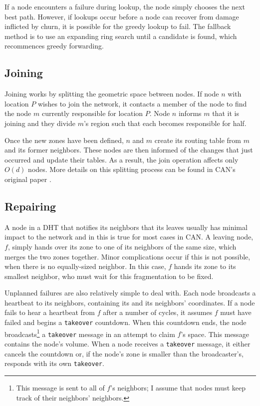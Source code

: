 \documentclass[10pt,letterpaper,twoside]{report}
\begin{document}
If a node encounters a failure during lookup, the node simply chooses the next best path.
However, if lookups occur before a node can recover from damage inflicted by churn, it is possible for the greedy lookup to fail.
The fallback method is to use an expanding ring search until a candidate is found, which recommences greedy forwarding.

\subsection*{Joining}
Joining works by splitting the geometric space between nodes.  
If node $n$ with location $P$ wishes to join the network, it contacts a member of the node to find the node $m$ currently responsible for location $P$.
Node $n$ informs $m$ that it is joining and they divide $m$'s region such that each becomes responsible for half.

Once the new zones have been defined, $n$ and $m$ create its routing table from $m$ and its former neighbors.
These nodes are then informed of the changes that just occurred and update their tables.
As a result, the join operation affects only $O(d)$ nodes.  
More details on this splitting process can be found in CAN's original paper \cite{can}.

\subsection*{Repairing}
A node in a DHT that notifies its neighbors that its leaves usually has minimal impact to the  network and in this is true for most cases in CAN.
A leaving node, $f$, simply hands over its zone to one of its neighbors of the same size, which merges the two zones together.
Minor complications occur if this is not possible, when there is no equally-sized neighbor. 
In this case, $f$ hands its zone to its smallest neighbor, who must wait for this fragmentation to be fixed.



Unplanned failures are also relatively simple to deal with.
Each node broadcasts a heartbeat to its neighbors, containing its and its neighbors' coordinates.
If a node fails to hear a heartbeat from $f$ after a number of cycles, it assumes $f$ must have failed and begins a \texttt{takeover} countdown.
When this countdown ends, the node broadcasts\footnote{This message is sent to all of $f$'s neighbors;  I assume that nodes must keep track of their neighbors' neighbors.} a \texttt{takeover} message in an attempt to claim $f$'s space.
This message contains the node's volume.
When a node receives a \texttt{takeover} message, it either cancels the countdown or, if the node's zone is smaller than the broadcaster's, responds with its own \texttt{takeover}.
\end{document}
